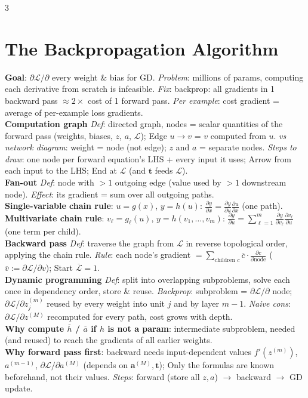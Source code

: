 \documentclass[10pt]{article}
\newcommand{\vt}{\mathbf{t}}
\newcommand{\cL}{\mathcal{L}}
\newcommand{\sub}[1]{\textit{#1}:}  %
\newcommand{\va}{\mathbf{a}}
\begin{document}
\begin{multicols*}{3}
\section{The Backpropagation Algorithm}
\textbf{Goal}: $\partial\cL/\partial$ every weight \& bias for GD. \sub{Problem} millions of params, computing each derivative from scratch is infeasible. \sub{Fix} backprop: all gradients in 1 backward pass $\approx2\times$ cost of 1 forward pass. \sub{Per example} cost gradient = average of per-example loss gradients.\\
\textbf{Computation graph} \sub{Def} directed graph, nodes = scalar quantities of the forward pass (weights, biases, $z$, $a$, $\cL$); Edge $u\to v$ = $v$ computed from $u$. \sub{vs network diagram} weight = node (not edge); $z$ and $a$ = separate nodes. \sub{Steps to draw} one node per forward equation's LHS + every input it uses; Arrow from each input to the LHS; End at $\cL$ (and $\vt$ feeds $\cL$).\\
\textbf{Fan-out} \sub{Def} node with $>1$ outgoing edge (value used by $>1$ downstream node). \sub{Effect} its gradient = sum over all outgoing paths.\\
\textbf{Single-variable chain rule}: $u=g(x)$, $y=h(u)$: $\frac{\partial y}{\partial x}=\frac{\partial y}{\partial u}\frac{\partial u}{\partial x}$ (one path).\\
\textbf{Multivariate chain rule}: $v_\ell=g_\ell(u)$, $y=h(v_1,\dots,v_m)$: $\frac{\partial y}{\partial u}=\sum_{\ell=1}^m\frac{\partial y}{\partial v_\ell}\frac{\partial v_\ell}{\partial u}$ (one term per child).\\
\textbf{Backward pass} \sub{Def} traverse the graph from $\cL$ in reverse topological order, applying the chain rule. \sub{Rule} each node's gradient $=\sum_{\text{children }c}\overline{c}\cdot\frac{\partial c}{\partial\text{node}}$ ($\overline{v}:=\partial\cL/\partial v$); Start $\overline{\cL}=1$.\\
\textbf{Dynamic programming} \sub{Def} split into overlapping subproblems, solve each once in dependency order, store \& reuse. \sub{Backprop} subproblem = $\partial\cL/\partial$ node; $\partial\cL/\partial z^{(m)}_j$ reused by every weight into unit $j$ and by layer $m\!-\!1$. \sub{Naive cons} $\partial\cL/\partial z^{(M)}$ recomputed for every path, cost grows with depth.\\
\textbf{Why compute $\overline{h}$ / $\overline{a}$ if $h$ is not a param}: intermediate subproblem, needed (and reused) to reach the gradients of all earlier weights.\\
\textbf{Why forward pass first}: backward needs input-dependent values $f'(z^{(m)})$, $a^{(m-1)}$, $\partial\cL/\partial a^{(M)}$ (depends on $\va^{(M)},\vt$); Only the formulas are known beforehand, not their values. \sub{Steps} forward (store all $z,a$) $\to$ backward $\to$ GD update.

\end{multicols*}
\end{document}
